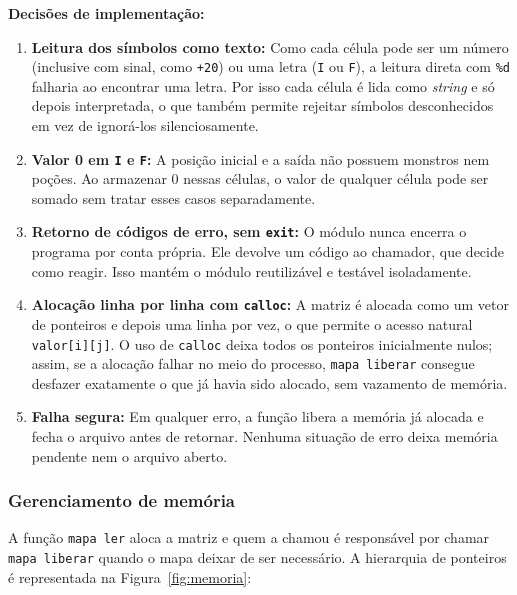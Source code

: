 \documentclass[12pt,a4paper]{article}
\makeatletter
\DeclareRobustCommand{\_}{%
  \ifmmode
    \nfss@text{\textunderscore}%
  \else
    \textunderscore\allowbreak
  \fi
}
\makeatother
\begin{document}
\textbf{Decisões de implementação:}
\begin{enumerate}
    \item \textbf{Leitura dos símbolos como texto:} Como cada célula pode ser um número (inclusive com sinal, como \texttt{+20}) ou uma letra (\texttt{I} ou \texttt{F}), a leitura direta com \texttt{\%d} falharia ao encontrar uma letra. Por isso cada célula é lida como \textit{string} e só depois interpretada, o que também permite rejeitar símbolos desconhecidos em vez de ignorá-los silenciosamente.
    \item \textbf{Valor 0 em \texttt{I} e \texttt{F}:} A posição inicial e a saída não possuem monstros nem poções. Ao armazenar 0 nessas células, o valor de qualquer célula pode ser somado sem tratar esses casos separadamente.
    \item \textbf{Retorno de códigos de erro, sem \texttt{exit}:} O módulo nunca encerra o programa por conta própria. Ele devolve um código ao chamador, que decide como reagir. Isso mantém o módulo reutilizável e testável isoladamente.
    \item \textbf{Alocação linha por linha com \texttt{calloc}:} A matriz é alocada como um vetor de ponteiros e depois uma linha por vez, o que permite o acesso natural \texttt{valor[i][j]}. O uso de \texttt{calloc} deixa todos os ponteiros inicialmente nulos; assim, se a alocação falhar no meio do processo, \texttt{mapa\_liberar} consegue desfazer exatamente o que já havia sido alocado, sem vazamento de memória.
    \item \textbf{Falha segura:} Em qualquer erro, a função libera a memória já alocada e fecha o arquivo antes de retornar. Nenhuma situação de erro deixa memória pendente nem o arquivo aberto.
\end{enumerate}
 
\subsubsection*{Gerenciamento de memória}
 
A função \texttt{mapa\_ler} aloca a matriz e quem a chamou é responsável por chamar \texttt{mapa\_liberar} quando o mapa deixar de ser necessário. A hierarquia de ponteiros é representada na Figura~\ref{fig:memoria}:
 
\end{document}
